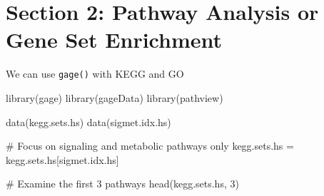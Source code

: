 \documentclass[
  letterpaper,
  DIV=11,
  numbers=noendperiod]{scrartcl}
\newenvironment{Shaded}{\begin{snugshade}}{\end{snugshade}}
\newcommand{\CommentTok}[1]{\textcolor[rgb]{0.37,0.37,0.37}{#1}}
\newcommand{\DecValTok}[1]{\textcolor[rgb]{0.68,0.00,0.00}{#1}}
\newcommand{\FunctionTok}[1]{\textcolor[rgb]{0.28,0.35,0.67}{#1}}
\newcommand{\NormalTok}[1]{\textcolor[rgb]{0.00,0.23,0.31}{#1}}
\newcommand{\OtherTok}[1]{\textcolor[rgb]{0.00,0.23,0.31}{#1}}
\begin{document}
\hypertarget{section-2-pathway-analysis-or-gene-set-enrichment}{%
\section{Section 2: Pathway Analysis or Gene Set
Enrichment}\label{section-2-pathway-analysis-or-gene-set-enrichment}}

We can use \texttt{gage()} with KEGG and GO

\begin{Shaded}
\begin{Highlighting}[]
\FunctionTok{library}\NormalTok{(gage)}
\FunctionTok{library}\NormalTok{(gageData)}
\FunctionTok{library}\NormalTok{(pathview)}

\FunctionTok{data}\NormalTok{(kegg.sets.hs)}
\FunctionTok{data}\NormalTok{(sigmet.idx.hs)}

\CommentTok{\# Focus on signaling and metabolic pathways only}
\NormalTok{kegg.sets.hs }\OtherTok{=}\NormalTok{ kegg.sets.hs[sigmet.idx.hs]}

\CommentTok{\# Examine the first 3 pathways}
\FunctionTok{head}\NormalTok{(kegg.sets.hs, }\DecValTok{3}\NormalTok{)}
\end{Highlighting}
\end{Shaded}
\end{document}

